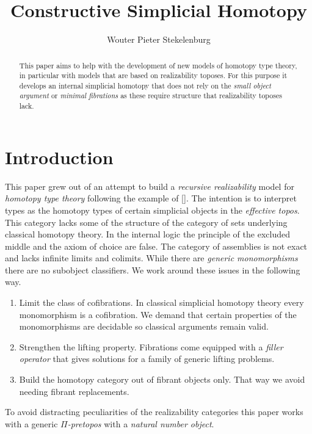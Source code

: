 \documentclass{tac}
\title{Constructive Simplicial Homotopy}
\author{Wouter Pieter Stekelenburg}\copyrightyear{2015}
\newcommand\hide[1]{}
\newcommand\citep[1]{[\cite{#1}]}
\begin{document}
\begin{abstract} This paper aims to help with the development of new models of homotopy type theory, in particular with models that are based on realizability toposes. For this purpose it develops an internal simplicial homotopy that does not rely on the \emph{small object argument} or \emph{minimal fibrations} as these require structure that realizability toposes lack.\end{abstract}

\hide{
Three papers:
-simplicial homotopy
-complete categories [how they are preserved]
-the realizability model of HOTT [how to get a fibrant object out of a category]

Idee: reverse the order. definitions--theorem--lemmas. That way the purpose of the lemmas is set up from the start.
}

\maketitle

\section*{Introduction}
This paper grew out of an attempt to build a \emph{recursive realizability} model for \emph{homotopy type theory} following the example of \citep{KLV12}. The intention is to interpret types as the homotopy types of certain simplicial objects in the \emph{effective topos}. This category lacks some of the structure of the category of sets underlying classical homotopy theory. In the internal logic the principle of the excluded middle and the axiom of choice are false. The category of assemblies is not exact and lacks infinite limits and colimits. While there are \emph{generic monomorphisms} there are no subobject classifiers. We work around these issues in the following way.
\begin{enumerate}
\item Limit the class of cofibrations. In classical simplicial homotopy theory every mono\-morphism is a cofibration. We demand that certain properties of the monomorphisms are decidable so classical arguments remain valid.
\item Strengthen the lifting property. Fibrations come equipped with a \emph{filler operator} that gives solutions for a family of generic lifting problems.
\item Build the homotopy category out of fibrant objects only. That way we avoid needing fibrant replacements.
\end{enumerate}
To avoid distracting peculiarities of the realizability categories this paper works with a generic \emph{$\Pi$-pretopos} with a \emph{natural number object}. 
\end{document}
